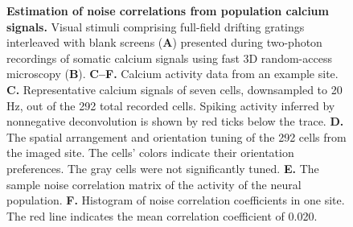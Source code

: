 \begin{figure}
\begin{leftfullpage}
\caption[Estimation of noise correlations from population calcium signals]
{{\bf Estimation of noise correlations from population calcium signals.}
Visual stimuli comprising full-field drifting gratings interleaved with blank screens ({\bf A}) presented during two-photon recordings of somatic calcium signals using fast 3D random-access microscopy ({\bf B}).
{\bf C--F.} Calcium activity data from an example site.
{\bf C.} Representative calcium signals of seven cells, downsampled to 20 Hz, out of the 292 total recorded cells. Spiking activity inferred by nonnegative deconvolution is shown by red ticks below the trace.
{\bf D.} The spatial arrangement and orientation tuning of the 292 cells from the imaged site. The cells' colors indicate their orientation preferences. The gray cells were not significantly tuned.
{\bf E.} The sample noise correlation matrix of the activity of the neural population.
{\bf F.} Histogram of noise correlation coefficients in one site. The red line indicates the mean correlation coefficient of 0.020.
} \label{fig:2}
\end{leftfullpage}
\end{figure}

